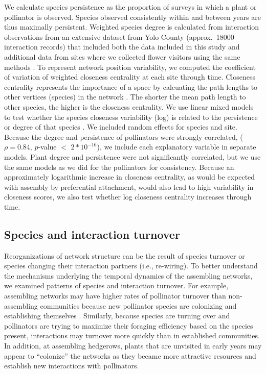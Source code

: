 \documentclass[12pt]{article}
\begin{document}
We calculate species persistence as the proportion of surveys in which
a plant or pollinator is observed. Species observed consistently
within and between years are thus maximally persistent. Weighted
species degree is calculated from interaction observations from an
extensive dataset from Yolo County (approx.~18000 interaction records)
that included both the data included in this study and additional data
from sites where we collected flower visitors using the same methods
\citep{mgonigle-2015-x, ponisio2015farm}. To represent network
position variability, we computed the coefficient of variation of
weighted closeness centrality \citep{freeman1978centrality} at each
site through time. Closeness centrality represents the importance of a
space by calcuating the path lengths to other vertices (species) in
the network \citep{freeman1978centrality}. The shorter the mean path
length to other species, the higher is the closeness centrality. We
use linear mixed models to test whether the species closeness
variability (log) is related to the persistence or degree of that
species \citep{lme4, lmetest}. We included random effects for species
and site. Because the degree and persistence of pollinators were
strongly correlated, ($\rho = 0.84$, $p$-value $<$ $2*10^{-16}$), we
include each explanatory variable in separate models. Plant degree and
persistence were not significantly correlated, but we use the same
models as we did for the pollinators for consistency.  Because an
approximately logarithmic increase in closeness centrality, as would
be expected with assembly by preferential attachment, would also lead
to high variability in closeness scores, we also test whether log
closeness centrality increases through time.

\subsection*{Species and interaction turnover}

Reorganizations of network structure can be the result of species
turnover or species changing their interaction partners (i.e.,
re-wiring). To better understand the mechanisms underlying the
temporal dynamics of the assembling networks, we examined patterns of
species and interaction turnover. For example, assembling networks may
have higher rates of pollinator turnover than non-assembling
communities because new pollinator species are colonizing and
establishing themselves \citep{mgonigle-2015-x}. Similarly, because
species are turning over and pollinators are trying to maximize their
foraging efficiency based on the species present, interactions may
turnover more quickly than in established communities. In addition, at
assembling hedgerows, plants that are unvisited in early years may
appear to ``colonize'' the networks as they became more attractive
resources and establish new interactions with pollinators.
\end{document}
